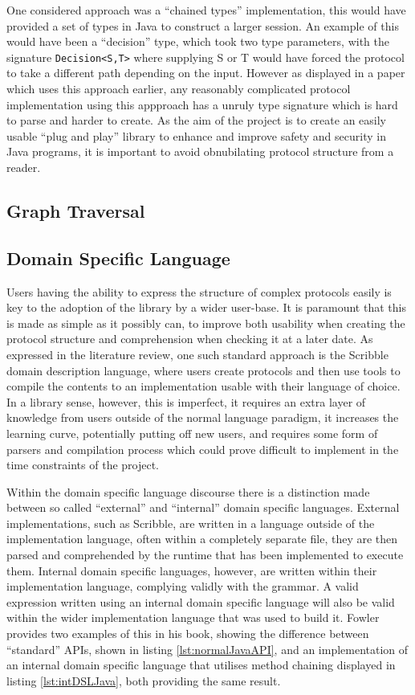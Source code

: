 \documentclass{article}
\begin{document}
	One considered approach was a ``chained types'' implementation, this would have provided a set of types in Java to construct a larger session. An example of this would have been a ``decision'' type, which took two type parameters, with the signature  \texttt{Decision<S,T>} where supplying S or T would have forced the protocol to take a different path depending on the input. However as displayed in a paper which uses this approach earlier\cite{jespersen2015session}, any reasonably complicated protocol implementation using this appproach has a unruly type signature which is hard to parse and harder to create. As the aim of the project is to create an easily usable ``plug and play'' library to enhance and improve safety and security in Java programs, it is important to avoid obnubilating protocol structure from a reader.
	
	
	\subsection{Graph Traversal}
	\subsection{Domain Specific Language}
	Users having the ability to express the structure of complex protocols easily is key to the adoption of the library by a wider user-base. It is paramount that this is made as simple as it possibly can, to improve both usability when creating the protocol structure and comprehension when checking it at a later date. As expressed in the literature review, one such standard approach is the Scribble\cite{honda2011scribbling} domain description language, where users create protocols and then use tools to compile the contents to an implementation usable with their language of choice. In a library sense, however, this is imperfect, it requires an extra layer of knowledge from users outside of the normal language paradigm, it increases the learning curve, potentially putting off new users, and requires some form of parsers and compilation process which could prove difficult to implement in the time constraints of the project.
	
	Within the domain specific language discourse there is a distinction made between so called ``external'' and ``internal'' domain specific languages\cite{Fowler:2010:DSL:1809745}. External implementations, such as Scribble, are written in a language outside of the implementation language, often within a completely separate file, they are then parsed and comprehended by the runtime that has been implemented to execute them. Internal domain specific languages, however, are written within their implementation language, complying validly with the grammar. A valid expression written using an internal domain specific language will also be valid within the wider implementation language that was used to build it. Fowler provides two examples of this in his book, showing the difference between ``standard'' APIs, shown in listing \ref{lst:normalJavaAPI}, and an implementation of an internal domain specific language that utilises method chaining displayed in listing \ref{lst:intDSLJava}, both providing the same result.
	
\end{document}
